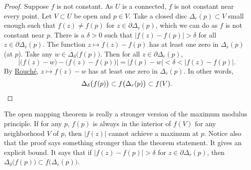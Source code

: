 \documentclass[12pt,openany]{book}
\newcommand{\sabs}[1]{\lvert {#1} \rvert}
\newcommand{\abs}[1]{\left\lvert {#1} \right\rvert}
\theoremstyle{plain}
\theoremstyle{remark}
\theoremstyle{definition}
\theoremstyle{exercise}
\theoremstyle{example}
\begin{document}
\begin{proof}
Suppose $f$ is not constant.  As $U$ is a connected, $f$ is not constant
near every point.
Let $V \subset U$ be open and $p \in V$.
Take 
a closed disc $\overline{\Delta_r(p)} \subset V$ small enough such that
$f(z) \not= f(p)$ for $z \in \partial \Delta_r(p)$, which we can do as $f$
is not constant near $p$.  There is a $\delta > 0$ such
that $\abs{f(z)-f(p)} > \delta$ for all $z \in \partial \Delta_r(p)$.
The function $z \mapsto f(z)-f(p)$ has at least one zero in $\Delta_r(p)$
(at $p$).  Take any $w \in \Delta_{\delta}\bigl(f(p)\bigr)$.  Then for
all $z \in \partial \Delta_r(p)$,
\begin{equation*}
\abs{\bigl( f(z)-w \bigr) - \bigl( f(z)-f(p) \bigr)} = \abs{f(p)-w} <
\delta < \abs{f(z)-f(p)} .
\end{equation*}
By \hyperref[thm:rouche2]{Rouch\'e}, $z \mapsto f(z)-w$ has at least one zero in $\Delta_r(p)$.
In other words,
\begin{equation*}
\Delta_{\delta}\bigl(f(p)\bigr) \subset
f\bigl(\Delta_r(p)\bigr) \subset f(V) .  \qedhere
\end{equation*}
\end{proof}

The open mapping theorem is really a stronger version of
the maximum modulus principle.
If for any $p$,
$f(p)$ is always in the interior of $f(V)$ for any neighborhood $V$ of
$p$, then $\sabs{f(z)}$ cannot achieve a maximum at $p$.
Notice also that the proof says something stronger than the theorem statement.  It
gives an explicit bound.  It says that if 
$\abs{f(z)-f(p)} > \delta$ for $z \in \partial \Delta_r(p)$,
then
$\Delta_{\delta}\bigl(f(p)\bigr) \subset f\bigl(\Delta_r(p)\bigr)$.
\end{document}
